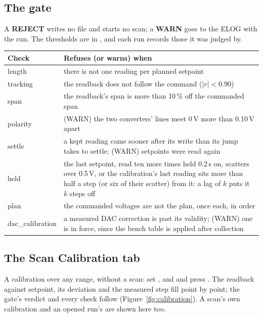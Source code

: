 \subsection{The gate}

A \textbf{REJECT} writes no file and starts no scan; a \textbf{WARN} goes to the ELOG with
the run. The thresholds are  in ,
and each run records those it was judged by.

\begin{center}
\begin{tabularx}{\textwidth}{@{}lL@{}}
\toprule
Check & Refuses (or warns) when \\
\midrule
length          & there is not one reading per planned setpoint \\
tracking        & the readback does not follow the command ($|r| < 0.90$) \\
span            & the readback's span is more than 10\,\% off the commanded span \\
polarity        & (WARN) the two converters' lines meet 0\,V more than 0.10\,V apart \\
settle          & a kept reading came sooner after its write than its jump takes to settle;
                  (WARN) setpoints were read again \\
held            & the last setpoint, read ten more times held 0.2\,s on, scatters over 0.5\,V,
                  or the calibration's last reading sits more than half a step (or six of
                  their scatter) from it: a lag of $k$ puts it $k$ steps off \\
plan            & the commanded voltages are not the plan, once each, in order \\
dac\_calibration & a measured DAC correction is past its validity; (WARN) one is in force,
                  since the bench table is applied after collection \\
\bottomrule
\end{tabularx}
\end{center}

\subsection{The Scan Calibration tab}

A calibration over any range, without a scan: set ,  and
 and press . The readback against setpoint, its
deviation and the measured step fill point by point; the gate's verdict and every check
follow (Figure~\ref{fig:calibration}). A scan's own calibration and an opened run's are
shown here too.

